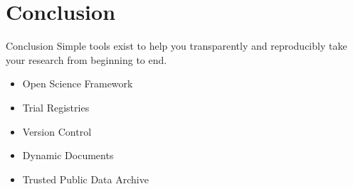 \documentclass{beamer}
\begin{document}
\section{Conclusion}
\begin{frame}{Conclusion}
Simple tools exist to help you transparently and reproducibly take your research from beginning to end. 
\begin {itemize}
\item Open Science Framework
\item Trial Registries
\item Version Control
\item Dynamic Documents
\item Trusted Public Data Archive
\end{itemize} 
\end{frame}
\end{document}

